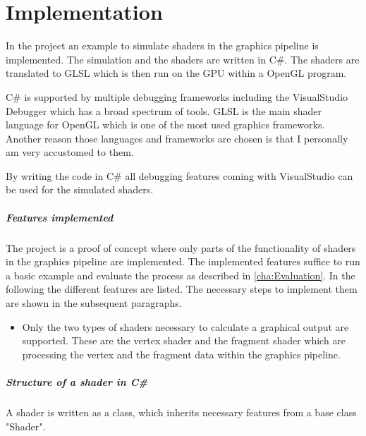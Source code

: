 
\chapter{Implementation}\label{cha:Implementation}

In the project  an example to simulate shaders in the graphics pipeline is implemented. The simulation and the shaders are written in C\#. The shaders are translated to GLSL which is then run on the GPU within a OpenGL program.

C\# is supported by multiple debugging frameworks including the VisualStudio Debugger which has a broad spectrum of tools.  GLSL is the main shader language for OpenGL which is one of the most used graphics frameworks. 
Another reason those languages and frameworks are chosen is that I personally am very accustomed to them.

By writing the code in C\# all debugging features coming with VisualStudio can be used for the simulated shaders.

\paragraph{Features implemented}

The project is a proof of concept where only parts of the functionality of shaders in the graphics pipeline are implemented. The implemented features suffice to run a basic example and evaluate the process as described in \autoref{cha:Evaluation}. In the following the different features are listed. The necessary steps to implement them are shown in the subsequent paragraphs.

\begin{itemize}
\item Only the two types of shaders necessary to calculate a graphical output are supported. These are the vertex shader and the fragment shader which are processing the vertex and the fragment data within the graphics pipeline.

\end{itemize}

\paragraph{Structure of a shader in C\#}

A shader is written as a class, which inherits necessary features from a base class "Shader".


